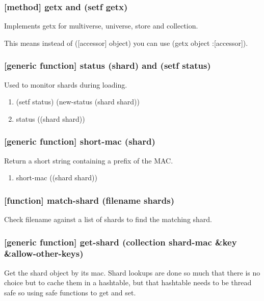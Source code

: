 \documentclass[11pt]{article}
\begin{document}
\subsubsection{[method] getx and (setf getx)}
\label{sec:org57e35d9}

Implements getx for multiverse, universe, store and collection.

This means instead of ([accessor] object) you can use (getx object :[accessor]).

\subsubsection{[generic function] status (shard) and (setf status)}
\label{sec:org29caaf8}

Used to monitor shards during loading.

\begin{enumerate}
\item (setf status) (new-status (shard shard))
\label{sec:orgd78a32c}

\item status ((shard shard))
\label{sec:org84d153d}
\end{enumerate}

\subsubsection{[generic function] short-mac (shard)}
\label{sec:org92cfec0}

Return a short string containing a prefix of the MAC.

\begin{enumerate}
\item short-mac ((shard shard))
\label{sec:org5321723}
\end{enumerate}

\subsubsection{[function] match-shard (filename shards)}
\label{sec:org5bd3a3b}

Check filename against a list of shards to find the matching shard.

\subsubsection{[generic function] get-shard (collection shard-mac \&key \&allow-other-keys)}
\label{sec:orgb961e66}

Get the shard object by its mac. Shard lookups are done so much that
there is no choice but to cache them in a hashtable, but that
hashtable needs to be thread safe so using safe functions to get and
set.
\end{document}
